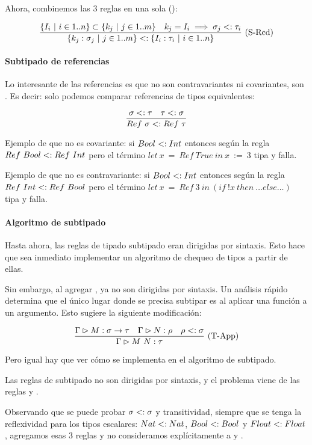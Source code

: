 Ahora, combinemos las 3 reglas en una sola ():

\[\frac{\{I_i \ |\  i \in 1..n\} \subset \{k_j \ |\  j \in 1..m\}\quad k_j = I_i \implies \sigma_j <: \tau_i}{\{k_j : \sigma_j \ |\  j \in 1..m\} <: \{I_i : \tau_i \ |\  i \in 1..n\}}\ \text{(S-Rcd)}\]

\paragraph{Subtipado de referencias}

Lo interesante de las referencias es que no son contravariantes ni covariantes, son . Es decir: solo podemos comparar referencias de tipos equivalentes:

\[\frac{\sigma <: \tau\quad \tau <: \sigma}{Ref\ \sigma <: Ref\ \tau}\]

Ejemplo de que no es covariante: si $Bool <: Int$ entonces según la regla $Ref\ Bool <: Ref\ Int$ pero el término $let\ x\ =\ Ref\ True\ in\ x\ :=\ 3$ tipa y falla.

Ejemplo de que no es contravariante: si $Bool <: Int$ entonces según la regla $Ref\ Int <: Ref\ Bool$ pero el término $let\ x\ =\ Ref\ 3\ in\ (if\ !x\ then\ \dots else \dots)$ tipa y falla.

\paragraph{Algoritmo de subtipado}

Hasta ahora, las reglas de tipado  subtipado eran dirigidas por sintaxis. Esto hace que sea inmediato implementar un algoritmo de chequeo de tipos a partir de ellas.

Sin embargo, al agregar , ya no son dirigidas por sintaxis. Un análisis rápido determina que el único lugar donde se precisa subtipar es al aplicar una función a un argumento. Esto sugiere la siguiente modificación:

\[\frac{\Gamma \rhd M : \sigma\to\tau\quad \Gamma \rhd N : \rho\quad \rho <: \sigma}{\Gamma \rhd M\ N : \tau}\ \text{(T-App)}\]

Pero igual hay que ver cómo se implementa en el algoritmo de subtipado.

Las reglas de subtipado no son dirigidas por sintaxis, y el problema viene de las reglas  y .

Observando que se puede probar $\sigma <: \sigma$ y transitividad, siempre que se tenga la reflexividad para los tipos escalares: $Nat <: Nat$, $Bool <: Bool$ y $Float <: Float$, agregamos esas 3 reglas y no consideramos explícitamente a  y .

